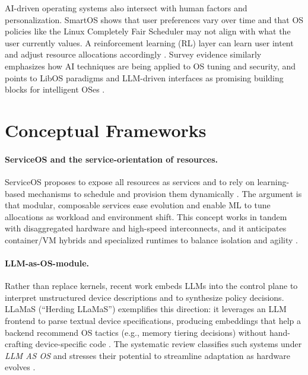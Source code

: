 \documentclass{article}
\begin{document}
AI-driven operating systems also intersect with human factors and personalization. SmartOS shows that user preferences vary over time and that OS policies like the Linux Completely Fair Scheduler may not align with what the user currently values. A reinforcement learning (RL) layer can learn user intent and adjust resource allocations accordingly \cite{goodarzy2021smartos}. %
Survey evidence similarly emphasizes how AI techniques are being applied to OS tuning and security, and points to LibOS paradigms and LLM-driven interfaces as promising building blocks for intelligent OSes \cite{zhang2024systematic}. %

\section{Conceptual Frameworks}
\paragraph{ServiceOS and the service-orientation of resources.}
ServiceOS proposes to expose all resources as services and to rely on learning-based mechanisms to schedule and provision them dynamically \cite{liu2021serviceos}. The argument is that modular, composable services ease evolution and enable ML to tune allocations as workload and environment shift. This concept works in tandem with disaggregated hardware and high-speed interconnects, and it anticipates container/VM hybrids and specialized runtimes to balance isolation and agility \cite{liu2021serviceos}. %

\paragraph{LLM-as-OS-module.}
Rather than replace kernels, recent work embeds LLMs into the control plane to interpret unstructured device descriptions and to synthesize policy decisions. LLaMaS (``Herding LLaMaS'') exemplifies this direction: it leverages an LLM frontend to parse textual device specifications, producing embeddings that help a backend recommend OS tactics (e.g., memory tiering decisions) without hand-crafting device-specific code \cite{kamath2024llamas}. %
The systematic review classifies such systems under \emph{LLM AS OS} and stresses their potential to streamline adaptation as hardware evolves \cite{zhang2024systematic}. %
\end{document}
